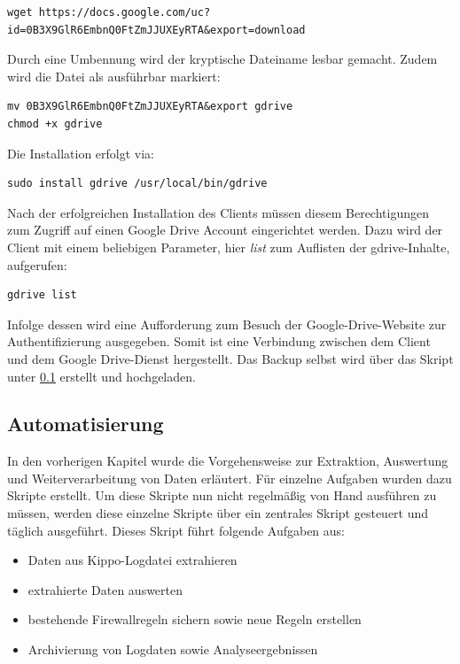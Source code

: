 \begin{lstlisting}[style=customc]
wget https://docs.google.com/uc?id=0B3X9GlR6EmbnQ0FtZmJJUXEyRTA&export=download
\end{lstlisting}

Durch eine Umbennung wird der kryptische Dateiname lesbar gemacht. Zudem wird die Datei als ausführbar markiert:

\begin{lstlisting}[style=customc]
mv 0B3X9GlR6EmbnQ0FtZmJJUXEyRTA&export gdrive
chmod +x gdrive
\end{lstlisting}

Die Installation erfolgt via:

\begin{lstlisting}[style=customc]
sudo install gdrive /usr/local/bin/gdrive
\end{lstlisting}

Nach der erfolgreichen Installation des Clients müssen diesem Berechtigungen zum Zugriff auf einen Google Drive Account eingerichtet werden. Dazu wird der Client mit einem beliebigen Parameter, hier \textit{list} zum Auflisten der gdrive-Inhalte, aufgerufen:

\begin{lstlisting}[style=customc]
gdrive list
\end{lstlisting}

Infolge dessen wird eine Aufforderung zum Besuch der Google-Drive-Website zur Authentifizierung ausgegeben. Somit ist eine Verbindung zwischen dem Client und dem Google Drive-Dienst hergestellt. Das Backup selbst wird über das Skript unter \ref{subsec:Automatisierung} erstellt und hochgeladen.


\subsection{Automatisierung}
\label{subsec:Automatisierung}

In den vorherigen Kapitel wurde die Vorgehensweise zur Extraktion, Auswertung und Weiterverarbeitung von Daten erläutert. Für einzelne Aufgaben wurden dazu Skripte erstellt. Um diese Skripte nun nicht regelmäßig von Hand ausführen zu müssen, werden diese einzelne Skripte über ein zentrales Skript gesteuert und täglich ausgeführt. Dieses Skript führt folgende Aufgaben aus:

\begin{itemize}
\item Daten aus Kippo-Logdatei extrahieren
\item extrahierte Daten auswerten
\item bestehende Firewallregeln sichern sowie neue Regeln erstellen
\item Archivierung von Logdaten sowie Analyseergebnissen
\end{itemize}

